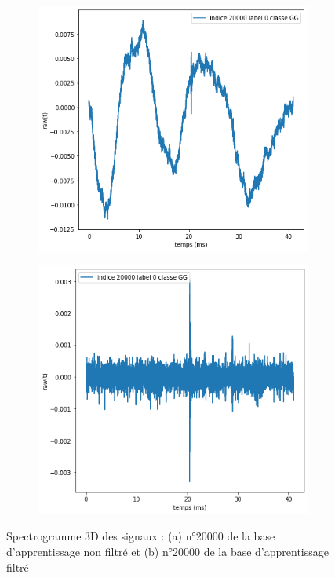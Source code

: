 \begin{figure}[!h]
\centering
  \begin{subfigure}[b]{0.3\textwidth}
    \includegraphics[width=\textwidth]{./images/indice20000Spectro1Dlabel9classeZCsansprocessingsanszoom.png}
    \caption{}
  \end{subfigure}
  \begin{subfigure}[b]{0.3\textwidth}
    \includegraphics[width=\textwidth]{./images/indice20000Spectro1Dlabel9classeZCavecprocessingsanszoom.png}
    \caption{}
  \end{subfigure}
  \caption{Spectrogramme 3D des signaux : (a) n°20000 de la base d'apprentissage non filtré et (b) n°20000 de la base d'apprentissage filtré%
\label{fig:20000zoomavecetsansfiltrage}}
\end{figure}

